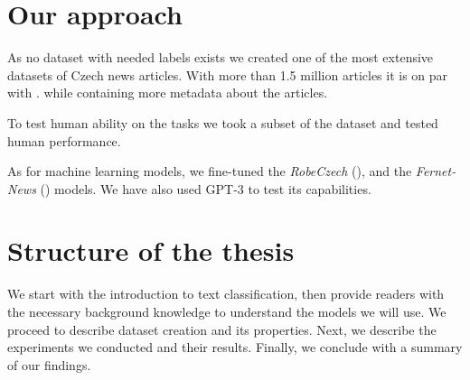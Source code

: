 \section*{Our approach}
As no dataset with needed labels exists we created one of the most extensive datasets of Czech news articles. 
With more than 1.5 million articles it is on par with \cite{sidoCzertCzechBERTlike2021}.
while containing more metadata about the articles.

To test human ability on the tasks we took a subset of the dataset and tested human performance.

As for machine learning models, we fine-tuned the \textit{RobeCzech} (\cite{strakaRobeCzechCzechRoBERTa2021}),
and the \textit{Fernet-News} (\cite{leheckaComparisonCzechTransformers2021}) models. 
We have also used GPT-3 \cite{brownLanguageModelsAre2020b} to test its capabilities.

\section*{Structure of the thesis}
We start with the introduction to text classification, then provide readers with the necessary background knowledge
to understand the models we will use. We proceed to describe dataset creation and its properties.
Next, we describe the experiments we conducted and their results. Finally, we conclude with a summary of our findings.

